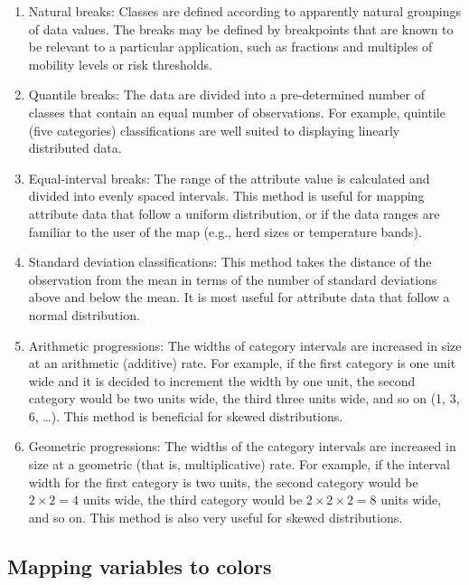 \documentclass[]{book}
\begin{document}
\begin{enumerate}
\def\labelenumi{\arabic{enumi}.}
\item
  Natural breaks: Classes are defined according to apparently natural
  groupings of data values. The breaks may be defined by breakpoints
  that are known to be relevant to a particular application, such as
  fractions and multiples of mobility levels or risk thresholds.
\item
  Quantile breaks: The data are divided into a pre-determined number of
  classes that contain an equal number of observations. For example,
  quintile (five categories) classifications are well suited to
  displaying linearly distributed data.
\item
  Equal-interval breaks: The range of the attribute value is calculated
  and divided into evenly spaced intervals. This method is useful for
  mapping attribute data that follow a uniform distribution, or if the
  data ranges are familiar to the user of the map (e.g., herd sizes or
  temperature bands).
\item
  Standard deviation classifications: This method takes the distance of
  the observation from the mean in terms of the number of standard
  deviations above and below the mean. It is most useful for attribute
  data that follow a normal distribution.
\item
  Arithmetic progressions: The widths of category intervals are
  increased in size at an arithmetic (additive) rate. For example, if
  the first category is one unit wide and it is decided to increment the
  width by one unit, the second category would be two units wide, the
  third three units wide, and so on (1, 3, 6, \ldots{}). This method is
  beneficial for skewed distributions.
\item
  Geometric progressions: The widths of the category intervals are
  increased in size at a geometric (that is, multiplicative) rate. For
  example, if the interval width for the first category is two units,
  the second category would be \(2 \times 2 = 4\) units wide, the third
  category would be \(2 \times 2 \times 2 = 8\) units wide, and so on.
  This method is also very useful for skewed distributions.
\end{enumerate}

\subsection{Mapping variables to
colors}\label{mapping-variables-to-colors}
\end{document}

